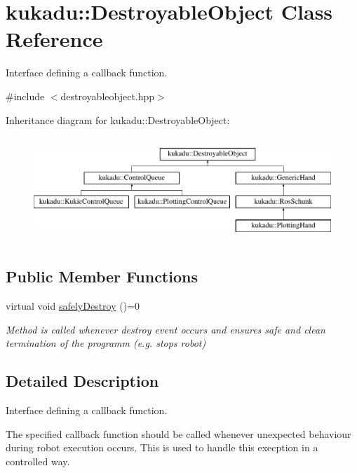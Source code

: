 \hypertarget{classkukadu_1_1DestroyableObject}{\section{kukadu\-:\-:Destroyable\-Object Class Reference}
\label{classkukadu_1_1DestroyableObject}
}


Interface defining a callback function.  




{\ttfamily \#include $<$destroyableobject.\-hpp$>$}

Inheritance diagram for kukadu\-:\-:Destroyable\-Object\-:\begin{figure}[H]
\begin{center}
\leavevmode
\includegraphics[height=4.000000cm]{classkukadu_1_1DestroyableObject}
\end{center}
\end{figure}
\subsection*{Public Member Functions}
\begin{DoxyCompactItemize}
\item 
virtual void \hyperlink{classkukadu_1_1DestroyableObject_a9e490cfa46af84690eb5ff0682df986c}{safely\-Destroy} ()=0
\begin{DoxyCompactList}\small\item\em Method is called whenever destroy event occurs and ensures safe and clean termination of the programm (e.\-g. stops robot) \end{DoxyCompactList}\end{DoxyCompactItemize}


\subsection{Detailed Description}
Interface defining a callback function. 

The specified callback function should be called whenever unexpected behaviour during robot execution occurs. This is used to handle this execption in a controlled way. 

